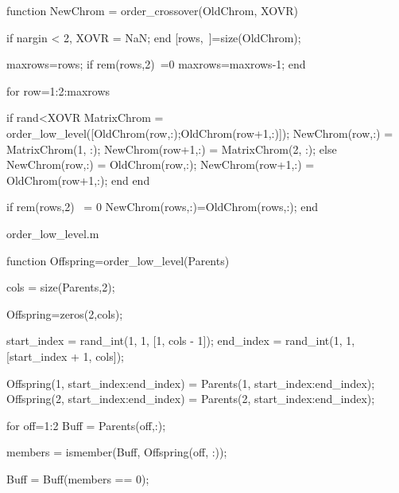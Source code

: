 {function NewChrom = order_crossover(OldChrom, XOVR)

if nargin < 2, XOVR = NaN; end
[rows,~]=size(OldChrom);
   
   maxrows=rows;
   if rem(rows,2)~=0
	   maxrows=maxrows-1;
   end
   
   for row=1:2:maxrows
	
	if rand<XOVR			%
        MatrixChrom = order_low_level([OldChrom(row,:);OldChrom(row+1,:)]);
		NewChrom(row,:) = MatrixChrom(1, :);
		NewChrom(row+1,:) = MatrixChrom(2, :);
	else
		NewChrom(row,:) = OldChrom(row,:);
		NewChrom(row+1,:) = OldChrom(row+1,:);
	end
   end

   if rem(rows,2) ~= 0
	   NewChrom(rows,:)=OldChrom(rows,:);
   end


order_low_level.m

%


function Offspring=order_low_level(Parents)

    cols = size(Parents,2);

    Offspring=zeros(2,cols);

    start_index = rand_int(1, 1, [1, cols - 1]);
    end_index = rand_int(1, 1, [start_index + 1, cols]);

    Offspring(1, start_index:end_index) = Parents(1, start_index:end_index);
    Offspring(2, start_index:end_index) = Parents(2, start_index:end_index);


    for off=1:2
        Buff = Parents(off,:);

        members = ismember(Buff, Offspring(off, :));


        Buff = Buff(members == 0);


        
}
